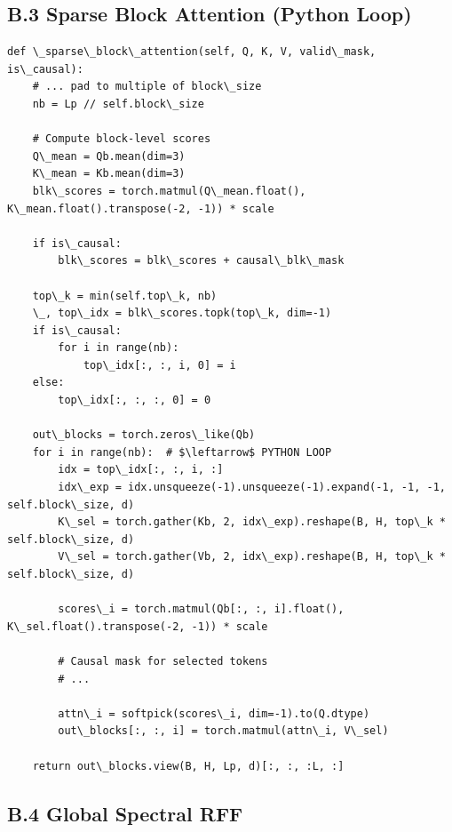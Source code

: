 \subsection{B.3 Sparse Block Attention (Python Loop)}

\begin{lstlisting}
def \_sparse\_block\_attention(self, Q, K, V, valid\_mask, is\_causal):
    # ... pad to multiple of block\_size
    nb = Lp // self.block\_size
    
    # Compute block-level scores
    Q\_mean = Qb.mean(dim=3)
    K\_mean = Kb.mean(dim=3)
    blk\_scores = torch.matmul(Q\_mean.float(), K\_mean.float().transpose(-2, -1)) * scale
    
    if is\_causal:
        blk\_scores = blk\_scores + causal\_blk\_mask
    
    top\_k = min(self.top\_k, nb)
    \_, top\_idx = blk\_scores.topk(top\_k, dim=-1)
    if is\_causal:
        for i in range(nb):
            top\_idx[:, :, i, 0] = i
    else:
        top\_idx[:, :, :, 0] = 0
    
    out\_blocks = torch.zeros\_like(Qb)
    for i in range(nb):  # $\leftarrow$ PYTHON LOOP
        idx = top\_idx[:, :, i, :]
        idx\_exp = idx.unsqueeze(-1).unsqueeze(-1).expand(-1, -1, -1, self.block\_size, d)
        K\_sel = torch.gather(Kb, 2, idx\_exp).reshape(B, H, top\_k * self.block\_size, d)
        V\_sel = torch.gather(Vb, 2, idx\_exp).reshape(B, H, top\_k * self.block\_size, d)
        
        scores\_i = torch.matmul(Qb[:, :, i].float(), K\_sel.float().transpose(-2, -1)) * scale
        
        # Causal mask for selected tokens
        # ... 
        
        attn\_i = softpick(scores\_i, dim=-1).to(Q.dtype)
        out\_blocks[:, :, i] = torch.matmul(attn\_i, V\_sel)
    
    return out\_blocks.view(B, H, Lp, d)[:, :, :L, :]
\end{lstlisting}

\subsection{B.4 Global Spectral RFF}

